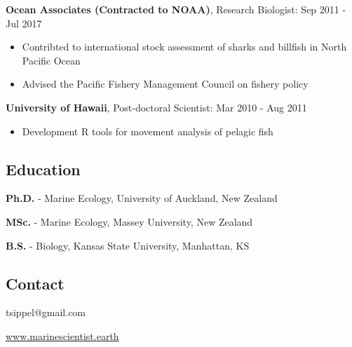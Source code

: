\documentclass[
  letterpaper,
  DIV=11,
  numbers=noendperiod]{scrartcl}
\providecommand{\tightlist}{%
  \setlength{\itemsep}{0pt}\setlength{\parskip}{0pt}}
\begin{document}
\textbf{Ocean Associates (Contracted to NOAA)}, Research Biologist: Sep
2011 - Jul 2017

\begin{tcolorbox}[enhanced jigsaw, arc=.35mm, colframe=quarto-callout-note-color-frame, breakable, leftrule=.75mm, opacityback=0, colback=white, left=2mm, rightrule=.15mm, toprule=.15mm, bottomrule=.15mm]

\begin{itemize}
\tightlist
\item
  Contribted to international stock assessment of sharks and billfish in
  North Pacific Ocean
\item
  Advised the Pacific Fishery Management Council on fishery policy
\end{itemize}

\end{tcolorbox}

\textbf{University of Hawaii}, Post-doctoral Scientist: Mar 2010 - Aug
2011

\begin{tcolorbox}[enhanced jigsaw, arc=.35mm, colframe=quarto-callout-note-color-frame, breakable, leftrule=.75mm, opacityback=0, colback=white, left=2mm, rightrule=.15mm, toprule=.15mm, bottomrule=.15mm]

\begin{itemize}
\tightlist
\item
  Development R tools for movement analysis of pelagic fish
\end{itemize}

\end{tcolorbox}

\subsection{Education}\label{education}

\textbf{Ph.D.} - Marine Ecology, University of Auckland, New Zealand

\textbf{MSc.} - Marine Ecology, Massey University, New Zealand

\textbf{B.S.} - Biology, Kansas State University, Manhattan, KS

\subsection{Contact}\label{contact}

tsippel@gmail.com

\url{www.marinescientist.earth}
\end{document}
